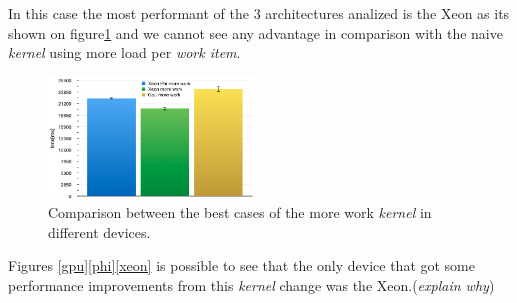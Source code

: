 \par{In this case the most performant of the 3 architectures analized is the Xeon as its shown on figure\ref{MoreWorkRes} and 
    we cannot see any advantage in comparison with the naive \emph{kernel} using more load per \emph{work item}.}

\begin{figure}[!h]
    \centering
    \includegraphics[width=0.49\textwidth]{figures/moreWorkRes.png}
    \caption{Comparison between the best cases of the more work \emph{kernel} in different devices.}
    \label{MoreWorkRes}
\end{figure}

\par{Figures \ref{gpu}\ref{phi}\ref{xeon} is possible to see that the only device that got some performance improvements from this \emph{kernel}
    change was the Xeon.(\emph{explain why})}





